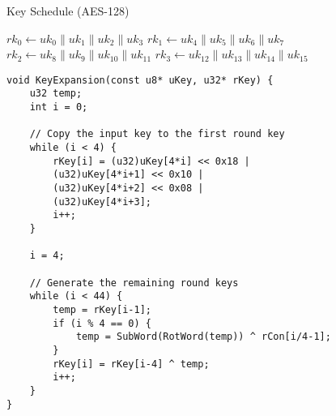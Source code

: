 \begin{algorithm}[H]
	\caption{Key Schedule (AES-128)}
	
	\BlankLine
	\( rk_0 \leftarrow uk_0\parallel uk_1\parallel uk_2 \parallel uk_3 \)\;
	\( rk_1 \leftarrow uk_4\parallel uk_5\parallel uk_6 \parallel uk_7 \)\;
	\( rk_2 \leftarrow uk_8\parallel uk_9\parallel uk_{10} \parallel uk_{11} \)\;
	\( rk_3 \leftarrow uk_{12}\parallel uk_{13}\parallel uk_{14} \parallel uk_{15} \)\;
\end{algorithm}
\vspace{24pt}
\begin{lstlisting}[style=C, caption={AES Key Expansion},captionpos=t]
void KeyExpansion(const u8* uKey, u32* rKey) {
	u32 temp;
	int i = 0;
	
	// Copy the input key to the first round key
	while (i < 4) {
		rKey[i] = (u32)uKey[4*i] << 0x18 | 
		(u32)uKey[4*i+1] << 0x10 | 
		(u32)uKey[4*i+2] << 0x08 | 
		(u32)uKey[4*i+3];
		i++;
	}
	
	i = 4;
	
	// Generate the remaining round keys
	while (i < 44) {
		temp = rKey[i-1];
		if (i % 4 == 0) {
			temp = SubWord(RotWord(temp)) ^ rCon[i/4-1];
		}
		rKey[i] = rKey[i-4] ^ temp;
		i++;
	}
}
\end{lstlisting}

\newpage
